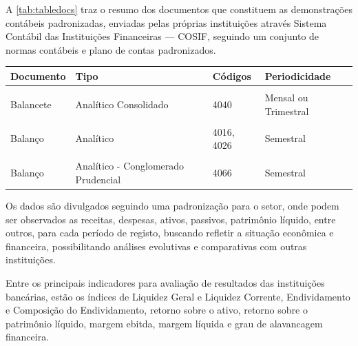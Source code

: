 \documentclass[12pt,12pt,openright,oneside,a4paper,chapter=TITLE,section=TITLE,subsection=TITLE,subsubsection=TITLE,english,french,spanish,portugues,sumario=tradicional]{abntex2}
\begin{document}
A \autoref{tab:tabledocs} traz o resumo dos documentos que constituem as demonstrações contábeis padronizadas, enviadas pelas próprias instituições através Sistema Contábil das Instituições Financeiras --- COSIF, seguindo um conjunto de normas contábeis e plano de contas padronizados.

\begin{table}
\caption{Tabela indicativa das Demonstrações Contábeis Padronizadas}
\begin{table}[H]
\centering\begingroup\fontsize{10}{12}\selectfont

\begin{tabular}[t]{llll}
\toprule
Documento & Tipo & Códigos & Periodicidade\\
\midrule
\cellcolor{gray!6}{Balancete} & \cellcolor{gray!6}{Analítico} & \cellcolor{gray!6}{4010, 4020, 4413, 4433} & \cellcolor{gray!6}{Mensal ou Trimestral}\\
Balancete & Analítico Consolidado & 4040 & Mensal ou Trimestral\\
\cellcolor{gray!6}{Balancete} & \cellcolor{gray!6}{Analítico - Conglomerado Prudencial} & \cellcolor{gray!6}{4060} & \cellcolor{gray!6}{Mensal ou Trimestral}\\
Balanço & Analítico & 4016, 4026 & Semestral\\
\cellcolor{gray!6}{Balanço} & \cellcolor{gray!6}{Analítico Consolidado} & \cellcolor{gray!6}{4046} & \cellcolor{gray!6}{Semestral}\\
\addlinespace
Balanço & Analítico - Conglomerado Prudencial & 4066 & Semestral\\
\bottomrule
\end{tabular}
\endgroup{}
\end{table}
\label{tab:tabledocs}
\end{table}

Os dados são divulgados seguindo uma padronização para o setor, onde podem ser observados as receitas, despesas, ativos, passivos, patrimônio líquido, entre outros, para cada período de registo, buscando refletir a situação econômica e financeira, possibilitando análises evolutivas e comparativas com outras instituições.

Entre os principais indicadores para avaliação de resultados das instituições bancárias, estão os índices de Liquidez Geral e Liquidez Corrente, Endividamento e Composição do Endividamento, retorno sobre o ativo, retorno sobre o patrimônio líquido, margem ebitda, margem líquida e grau de alavancagem financeira.
\end{document}
